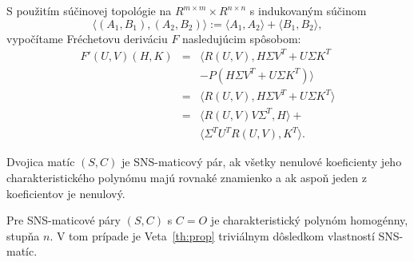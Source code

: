 \documentclass{svk_short_sk}
\begin{document}
S použitím súčinovej topológie na  $R^{m \times m} \times
R^{n \times n}$ s indukovaným súčinom 
\begin{equation}
\langle (A_{1},B_{1}), (A_{2},B_{2})\rangle := \langle A_{1},A_{2}\rangle
+ \langle B_{1},B_{2}\rangle,\label{eq2.10}
\end{equation}
vypočítame Fr\'{e}chetovu deriváciu $F$ nasledujúcim spôsobom:
\begin{eqnarray}
 F'(U,V)(H,K) &=& \langle R(U,V),H\Sigma V^{T} + U\Sigma K^{T}\nonumber\\
             && - P(H\Sigma V^{T} + U\Sigma K^{T})\rangle \nonumber \\
         &=& \langle R(U,V),H\Sigma V^{T} + U\Sigma K^{T}\rangle\nonumber \\
&=& \langle R(U,V)V\Sigma^{T},H\rangle + \nonumber\\
  &&    \langle \Sigma^{T}U^{T}R(U,V),K^{T}\rangle.    \label{eq2.11}
\end{eqnarray}


\begin{theorem} 
\label{th:prop} 
Dvojica matíc $(S,C)$ je {\rm SNS}-maticový pár, ak všetky nenulové
koeficienty jeho charakteristického polynómu majú rovnaké znamienko a
ak aspoň jeden z koeficientov je nenulový.
\end{theorem} 

Pre SNS-maticové páry $(S,C)$ s $C=O$ je charakteristický polynóm homogénny,
stupňa $n$. V tom prípade je Veta~\ref{th:prop} triviálnym dôsledkom 
vlastností SNS-matíc.
 



\end{document}
